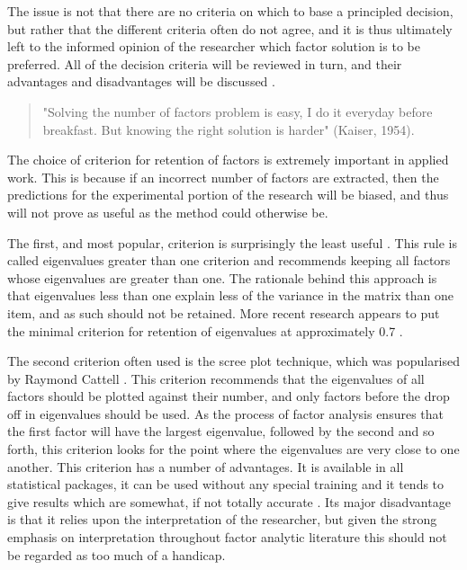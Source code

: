 The issue is not that there are no criteria on which to base a principled decision, but rather that the different criteria often do not agree, and it is thus ultimately left to the informed opinion of the researcher which factor solution is to be preferred.  All of the decision criteria will be reviewed in turn, and their advantages and disadvantages will be discussed \cite{henson2006use}. 

\begin{quotation}
  "Solving the number of factors problem is
     easy, I do it everyday before breakfast.  But knowing the right
     solution is harder" (Kaiser, 1954).
\end{quotation}

The choice of criterion for retention of factors is extremely important in applied work. This is because if an incorrect number of factors are extracted, then the predictions for the experimental portion of the research will be biased, and thus will not prove as useful as the method could otherwise be. 

The first, and most popular, criterion is surprisingly the least useful \cite{zwick1986comparison}. This rule is called eigenvalues greater than one criterion and recommends keeping all factors whose eigenvalues are greater than one. The rationale behind this approach is that eigenvalues less than one explain less of the variance in the matrix than one item, and as such should not be retained.  More recent research appears to put the minimal criterion for retention of eigenvalues at approximately 0.7 \cite{henson2006use}. 

The second criterion often used is the scree plot technique, which was popularised by Raymond Cattell . This criterion recommends that the eigenvalues of all factors should be plotted against their number, and only factors before the drop off in eigenvalues should be used. As the process of factor analysis ensures that the first factor will have the largest eigenvalue, followed by the second and so forth, this criterion looks for the point where the eigenvalues are very close to one another.  This criterion has a number of advantages.  It is available in all statistical packages, it can be used without any special training and it tends to give results which are somewhat, if not totally accurate \cite{zwick1986comparison}.  Its major disadvantage is that it relies upon the interpretation of the researcher, but given the strong emphasis on interpretation throughout factor analytic literature this should not be regarded as too much of a handicap.

